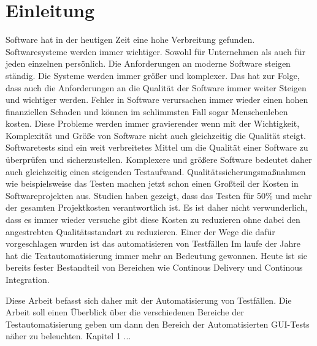 \chapter{Einleitung}
\label{sec:einleitung}

Software hat in der heutigen Zeit eine hohe Verbreitung gefunden. Softwaresysteme werden immer wichtiger. Sowohl für Unternehmen als auch für jeden einzelnen persönlich. Die Anforderungen an moderne Software steigen ständig. Die Systeme werden immer größer und komplexer. Das hat zur Folge, dass auch die Anforderungen an die Qualität der Software immer weiter Steigen und wichtiger werden.
Fehler in Software verursachen immer wieder einen hohen finanziellen Schaden und können im schlimmsten Fall sogar Menschenleben kosten. Diese Probleme werden immer gravierender wenn mit der Wichtigkeit, Komplexität und Größe von Software nicht auch gleichzeitig die Qualität steigt. \cite{burnstein_practical_2003} \newline
Softwaretests sind ein weit verbreitetes Mittel um die Qualität einer Software zu überprüfen und sicherzustellen.
Komplexere und größere Software bedeutet daher auch gleichzeitig einen steigenden Testaufwand.\newline
Qualitätssicherungsmaßnahmen wie beispielsweise das Testen machen jetzt schon einen Großteil der Kosten in Softwareprojekten aus. Studien haben gezeigt, dass das Testen für 50\% und mehr der gesamten Projektkosten verantwortlich ist. \cite{ramler_economic_2006} 
Es ist daher nicht verwunderlich, dass es immer wieder versuche gibt diese Kosten zu reduzieren ohne dabei den angestrebten Qualitätsstandart zu reduzieren.
Einer der Wege die dafür vorgeschlagen wurden ist das automatisieren von Testfällen 
\cite{harrold_testing:_2000}
Im laufe der Jahre hat die Teatautomatisierung immer mehr an Bedeutung gewonnen. Heute ist sie bereits fester Bestandteil von Bereichen wie Continous Delivery und Continous Integration.

Diese Arbeit befasst sich daher mit der Automatisierung von Testfällen. Die Arbeit soll einen Überblick über die verschiedenen Bereiche der Testautomatisierung geben um dann den Bereich der Automatisierten GUI-Tests näher zu beleuchten.
Kapitel 1 ...





